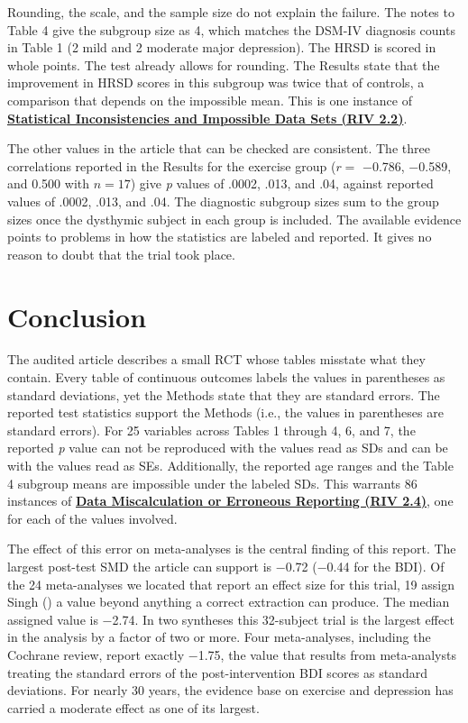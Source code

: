 \documentclass[
  letterpaper,
  DIV=11,
  numbers=noendperiod]{scrartcl}
\begin{document}
Rounding, the scale, and the sample size do not explain the failure. The
notes to Table 4 give the subgroup size as 4, which matches the DSM-IV
diagnosis counts in Table 1 (2 mild and 2 moderate major depression).
The HRSD is scored in whole points. The test already allows for
rounding. The Results state that the improvement in HRSD scores in this
subgroup was twice that of controls, a comparison that depends on the
impossible mean. This is one instance of
\href{https://auditclinicalevidence.org/riv.html#riv-2-2}{\textcolor{acerivblue}{\textbf{Statistical Inconsistencies and Impossible Data Sets (RIV 2.2)}}}.

The other values in the article that can be checked are consistent. The
three correlations reported in the Results for the exercise group
(\(r =\) −0.786, −0.589, and 0.500 with \(n = 17\)) give \emph{p} values
of .0002, .013, and .04, against reported values of .0002, .013, and
.04. The diagnostic subgroup sizes sum to the group sizes once the
dysthymic subject in each group is included. The available evidence
points to problems in how the statistics are labeled and reported. It
gives no reason to doubt that the trial took place.

\section{Conclusion}\label{sec-conclusion}

The audited article describes a small RCT whose tables misstate what
they contain. Every table of continuous outcomes labels the values in
parentheses as standard deviations, yet the Methods state that they are
standard errors. The reported test statistics support the Methods (i.e.,
the values in parentheses are standard errors). For 25 variables across
Tables 1 through 4, 6, and 7, the reported \emph{p} value can not be
reproduced with the values read as SDs and can be with the values read
as SEs. Additionally, the reported age ranges and the Table 4 subgroup
means are impossible under the labeled SDs. This warrants 86 instances
of
\href{https://auditclinicalevidence.org/riv.html#riv-2-4}{\textcolor{acerivblue}{\textbf{Data Miscalculation or Erroneous Reporting (RIV 2.4)}}},
one for each of the values involved.

The effect of this error on meta-analyses is the central finding of this
report. The largest post-test SMD the article can support is −0.72
(−0.44 for the BDI). Of the 24 meta-analyses we located that report an
effect size for this trial, 19 assign Singh
() a value beyond anything a correct
extraction can produce. The median assigned value is −2.74. In two
syntheses this 32-subject trial is the largest effect in the analysis by
a factor of two or more. Four meta-analyses, including the Cochrane
review, report exactly −1.75, the value that results from meta-analysts
treating the standard errors of the post-intervention BDI scores as
standard deviations. For nearly 30 years, the evidence base on exercise
and depression has carried a moderate effect as one of its largest.
\end{document}

